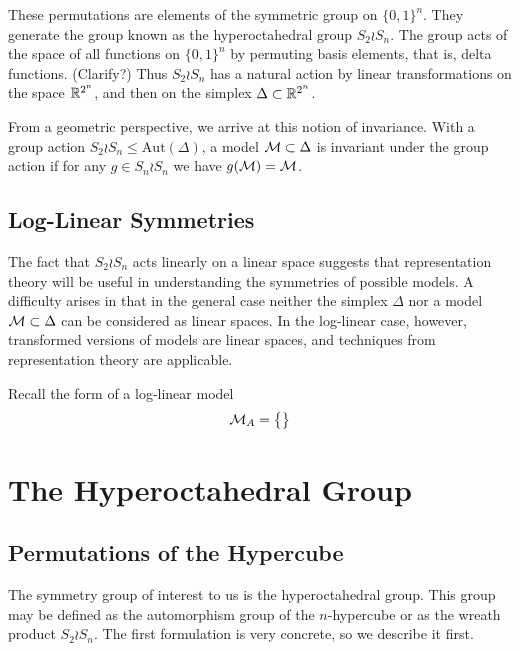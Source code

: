 \documentclass[cclicense]{hmcthesis}
\numberwithin{equation}{chapter}
\numberwithin{thmcounter}{chapter}
\begin{document}
    These permutations are elements of the symmetric group on $\{0, 1\}^n$.
    They generate the group known as the hyperoctahedral group $S_2 \wr S_n$.
    The group acts of the space of all functions on $\{0, 1\}^n$ by permuting
    basis elements, that is, delta functions.  (Clarify?)  Thus $S_2 \wr S_n$
    has a natural action by linear transformations on the space $\R^{2^n}$, and
    then on the simplex $\Delta \subset \R^{2^n}$.  
    
    From a geometric perspective, we arrive at this notion of invariance.  With
    a group action $S_2 \wr S_n \le \mathrm{Aut}(\Delta)$, a model $\ms \subset
    \Delta$ is invariant under the group action if for any $g \in S_n \wr S_n$
    we have $g(\ms) = \ms$.

\section{Log-Linear Symmetries}

    The fact that $S_2 \wr S_n$ acts linearly on a linear space suggests that
    representation theory will be useful in understanding the symmetries of
    possible models.  A difficulty arises in that in the general case neither
    the simplex $\Delta$ nor a model $\ms \subset \Delta$ can be considered as
    linear spaces.  In the log-linear case, however, transformed versions of
    models are linear spaces, and techniques from representation theory are
    applicable.

    Recall the form of a log-linear model
    \[
        \ms_A = \cdel[\big]{}
    \]

\chapter{The Hyperoctahedral Group}

\section{Permutations of the Hypercube}

    The symmetry group of interest to us is the hyperoctahedral group.  This
    group may be defined as the automorphism group of the $n$-hypercube or as
    the wreath product $S_2 \wr S_n$.
    The first formulation is very concrete, so we describe it first. 
\end{document}
